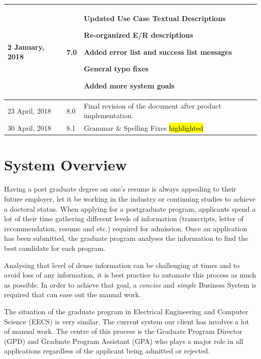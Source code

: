 \documentclass[fontsize=12pt,paper=letter,twoside]{scrartcl}
\begin{document}
\begin{tabular}{|l|l|p{3.5in}|}
\hline
2 January, 2018
& 7.0
& \begin{mylist}
\item Updated Use Case Textual Descriptions 
\item Re-organized E/R descriptions
\item Added error list and success list messages
\item General typo fixes
\item Added more system goals
\end{mylist} \\  
\hline
23 April, 2018
& 8.0
& Final revision of the document after product implementation. \\
\hline
30 April, 2018
& 8.1
& Grammar \& Spelling Fixes \hl{highlighted}\\
\hline
\end{tabular}

\newpage

\tableofcontents
\listoffigures
\listoftables
\newpage



\clearpage
\section{System Overview}

Having a post graduate degree on one's resume is always appealing to their future employer, let it be working in the industry or continuing studies to achieve a doctoral status. When applying for a postgraduate program, applicants spend a lot of their time gathering different levels of information (transcripts, letter of recommendation, resume and etc.) required for admission. Once an application has been submitted, the graduate program analyses the information to find the best candidate for each program.

Analysing that level of dense information can be challenging at times and to avoid loss of any information, it is best practice to automate this process as much as possible. In order to achieve that goal, a \emph{concise} and \emph{simple} Business System is required that can ease out the manual work.

The situation of the graduate program in Electrical Engineering and Computer Science (EECS) is very similar. The current system our client has involves a lot of manual work. The centre of this process is the Graduate Program Director (GPD) and Graduate Program Assistant (GPA) who plays a major role in all applications regardless of the applicant being admitted or rejected.
\end{document}
